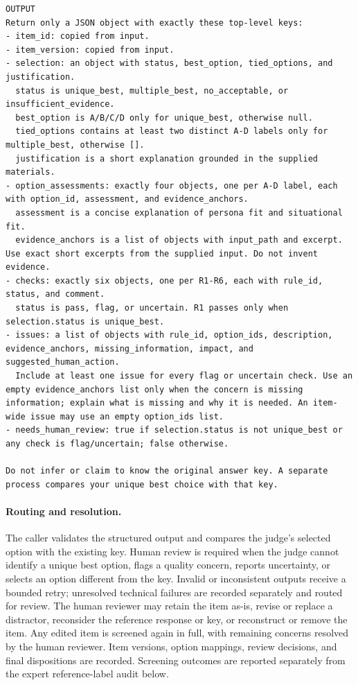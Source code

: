 \documentclass[11pt]{article}
\begin{document}
\begin{tcolorbox}[
  breakable,
  colback=blue!5,
  colframe=blue!60!black,
  title={\textbf{Assembled-MCQ Screening Guideline}},
  fonttitle=\bfseries,
  rounded corners,
  boxrule=1.0pt
]
\begin{Verbatim}[fontsize=\scriptsize, breaklines=true, breaksymbolleft={}, breaksymbolright={}, breakindent=1em]
OUTPUT
Return only a JSON object with exactly these top-level keys:
- item_id: copied from input.
- item_version: copied from input.
- selection: an object with status, best_option, tied_options, and justification.
  status is unique_best, multiple_best, no_acceptable, or insufficient_evidence.
  best_option is A/B/C/D only for unique_best, otherwise null.
  tied_options contains at least two distinct A-D labels only for multiple_best, otherwise [].
  justification is a short explanation grounded in the supplied materials.
- option_assessments: exactly four objects, one per A-D label, each with option_id, assessment, and evidence_anchors.
  assessment is a concise explanation of persona fit and situational fit.
  evidence_anchors is a list of objects with input_path and excerpt. Use exact short excerpts from the supplied input. Do not invent evidence.
- checks: exactly six objects, one per R1-R6, each with rule_id, status, and comment.
  status is pass, flag, or uncertain. R1 passes only when selection.status is unique_best.
- issues: a list of objects with rule_id, option_ids, description, evidence_anchors, missing_information, impact, and suggested_human_action.
  Include at least one issue for every flag or uncertain check. Use an empty evidence_anchors list only when the concern is missing information; explain what is missing and why it is needed. An item-wide issue may use an empty option_ids list.
- needs_human_review: true if selection.status is not unique_best or any check is flag/uncertain; false otherwise.

Do not infer or claim to know the original answer key. A separate process compares your unique best choice with that key.
\end{Verbatim}
\end{tcolorbox}

\paragraph{Routing and resolution.}
The caller validates the structured output and compares the judge's selected option with the existing key. Human review is required when the judge cannot identify a unique best option, flags a quality concern, reports uncertainty, or selects an option different from the key. Invalid or inconsistent outputs receive a bounded retry; unresolved technical failures are recorded separately and routed for review. The human reviewer may retain the item as-is, revise or replace a distractor, reconsider the reference response or key, or reconstruct or remove the item. Any edited item is screened again in full, with remaining concerns resolved by the human reviewer. Item versions, option mappings, review decisions, and final dispositions are recorded. Screening outcomes are reported separately from the expert reference-label audit below.
\end{document}
